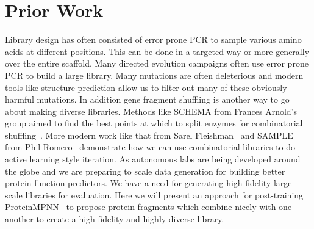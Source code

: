 \section{Prior Work}
\label{sec:related}

Library design has often consisted of error prone PCR to sample various amino
acids at different positions. This can be done in a targeted way or more
generally over the entire scaffold. Many directed evolution campaigns often use
error prone PCR to build a large library. Many mutations are often deleterious
and modern tools like structure prediction allow us to filter out many of these
obviously harmful mutations. In addition gene fragment shuffling is another way
to go about making diverse libraries. Methods like SCHEMA from Frances Arnold's
group aimed to find the best points at which to split enzymes for combinatorial
shuffling~\cite{voigt2002schema,meyer2003schemalibrary}. More modern work like
that from Sarel Fleishman~\cite{khersonsky2018funclib} and SAMPLE from Phil
Romero~\cite{rapp2024sample} demonstrate how we can use combinatorial libraries
to do active learning style iteration. As autonomous labs are being developed
around the globe and we are preparing to scale data generation for building
better protein function predictors. We have a need for generating high fidelity
large scale libraries for evaluation. Here we will present an approach for
post-training ProteinMPNN~\cite{dauparas2022proteinmpnn} to propose protein
fragments which combine nicely with one another to create a high fidelity and
highly diverse library.

